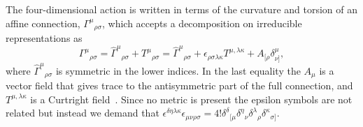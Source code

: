 \documentclass[aps,prl,twocolumn,superscriptaddress,showpacs,showkeys]{revtex4-1}
\begin{document}
The four-dimensional action is written in terms of the curvature and torsion of an affine connection, $\Gamma^\mu{}_{\rho\sigma}$, which accepts a decomposition on irreducible representations as
\begin{equation}
  \Gamma^\mu{}_{\rho\sigma} = \hat{\Gamma}^\mu{}_{\rho\sigma} + T^\mu{}_{\rho\sigma} = \hat{\Gamma}^\mu{}_{\rho\sigma} + \epsilon_{\rho\sigma\lambda\kappa}T^{\mu,\lambda\kappa}+A_{[\rho}\delta^\mu_{\nu]},
\end{equation}
where $\hat{\Gamma}^\mu{}_{\rho\sigma}$ is symmetric in the lower indices. In the last equality the $A_\mu$ is a vector field that gives trace to the antisymmetric part of the full connection, and  $T^{\mu,\lambda\kappa}$ is a Curtright field~\cite{Curtright:1980yk}. Since no metric is present  the epsilon symbols are not related but instead we demand that \mbox{$\epsilon^{\delta\eta\lambda\kappa}\epsilon_{\mu\nu\rho\sigma}=4!\delta^{\delta}{}_{[\mu}\delta^\eta{}_{\nu}\delta^{\lambda}{}_{\rho} \delta^\kappa{}_{\sigma]}$.}
\end{document}
